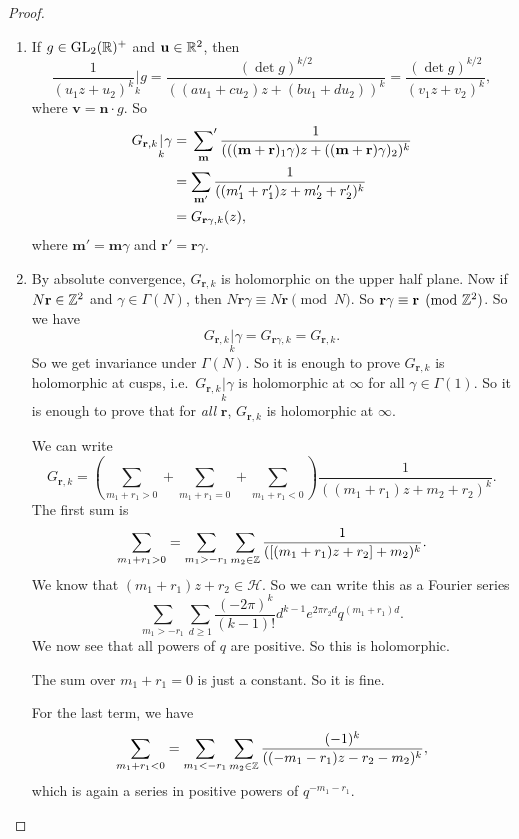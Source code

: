 \documentclass[a4paper]{article}
\renewcommand{\H}{\mathcal{H}}
\begin{document}
\begin{proof}\leavevmode
  \begin{enumerate}
    \item If $g \in \mathrm{GL}_2(\mathbb{R})^+$ and $\mathbf{u} \in \mathbb{R}^2$, then
      \[
        \frac{1}{(u_1 z + u_2)^k} \underset{k}{|} g = \frac{(\det g)^{k/2}}{ ((au_1 + cu_2) z + (bu_1 + d u_2))^k} = \frac{(\det g)^{k/2}}{(v_1 z + v_2)^k},
      \]
      where $\mathbf{v} = \mathbf{n}\cdot g$. So
      \begin{align*}
        G_{\mathbf{r}, k} \underset{k}{|}\gamma &= \sideset{}{'}\sum_{\mathbf{m}}\frac{1}{(((\mathbf{m} + \mathbf{r})_1 \gamma) z + ((\mathbf{m} + \mathbf{r})\gamma)_2)^k} \\
        &= \sum_{\mathbf{m}'} \frac{1}{((m_1' + r_1') z + m_2' + r_2')^k}\\
        &= G_{\mathbf{r} \gamma, k}(z),
      \end{align*}
      where $\mathbf{m}' = \mathbf{m} \gamma$ and $\mathbf{r}' = \mathbf{r} \gamma$.
    \item By absolute convergence, $G_{\mathbf{r}, k}$ is holomorphic on the upper half plane. Now if $N\mathbf{r} \in \mathbb{Z}^2$ and $\gamma \in \Gamma(N)$, then $N\mathbf{r} \gamma \equiv N\mathbf{r} \pmod N$. So $\mathbf{r} \gamma \equiv \mathbf{r} \pmod {\mathbb{Z}^2}$. So we have
      \[
        G_{\mathbf{r}, k}\underset{k}{|}\gamma = G_{\mathbf{r} \gamma, k} = G_{\mathbf{r}, k}.
      \]
      So we get invariance under $\Gamma(N)$. So it is enough to prove $G_{\mathbf{r}, k}$ is holomorphic at cusps, i.e.\ $G_{\mathbf{r}, k}\underset{k}{|} \gamma$ is holomorphic at $\infty$ for all $\gamma \in \Gamma(1)$. So it is enough to prove that for \emph{all} $\mathbf{r}$, $G_{\mathbf{r}, k}$ is holomorphic at $\infty$.

      We can write
      \[
        G_{\mathbf{r}, k} = \left(\sum_{m_1 + r_1 > 0} + \sum_{m_1 + r_1 = 0} + \sum_{m_1 + r_1 < 0}\right)\frac{1}{((m_1 + r_1) z + m_2 + r_2)^k}.
      \]
      The first sum is
      \[
        \sum_{m_1 + r_1 > 0} = \sum_{m_1 > - r_1} \sum_{m_2 \in \mathbb{Z}} \frac{1}{([(m_1 + r_1) z + r_2] + m_2)^k}.
      \]
      We know that $(m_1 + r_1)z + r_2 \in \H$. So we can write this as a Fourier series
      \[
        \sum_{m_1 > -r_1} \sum_{d \geq 1} \frac{(-2\pi)^k}{(k - 1)!} d^{k - 1} e^{2\pi r_2 d} q^{(m_1 + r_1) d}.
      \]
      We now see that all powers of $q$ are positive. So this is holomorphic.

      The sum over $m_1 + r_1 = 0$ is just a constant. So it is fine.

      For the last term, we have
      \[
        \sum_{m_1 + r_1 < 0} = \sum_{m_1 < - r_1} \sum_{m_2 \in \mathbb{Z}} \frac{(-1)^k}{((-m_1 - r_1)z - r_2 - m_2)^k},
      \]
      which is again a series in positive powers of $q^{-m_1 - r_1}$.\qedhere
  \end{enumerate}
\end{proof}
\end{document}
